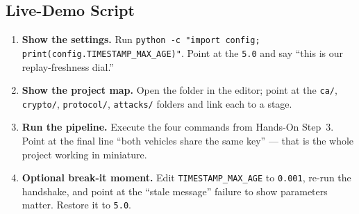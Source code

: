 \documentclass[11pt,a4paper]{report}
\begin{document}
\subsection{Live-Demo Script}
\begin{enumerate}
  \item \textbf{Show the settings.} Run
        \texttt{python -c "import config; print(config.TIMESTAMP\_MAX\_AGE)"}.
        Point at the \texttt{5.0} and say ``this is our replay-freshness dial.''
  \item \textbf{Show the project map.} Open the folder in the editor; point at
        the \texttt{ca/}, \texttt{crypto/}, \texttt{protocol/}, \texttt{attacks/}
        folders and link each to a stage.
  \item \textbf{Run the pipeline.} Execute the four commands from
        Hands-On Step~3. Point at the final line ``both vehicles share the same
        key'' --- that is the whole project working in miniature.
  \item \textbf{Optional break-it moment.} Edit \texttt{TIMESTAMP\_MAX\_AGE} to
        \texttt{0.001}, re-run the handshake, and point at the ``stale message''
        failure to show parameters matter. Restore it to \texttt{5.0}.
\end{enumerate}
\end{document}
